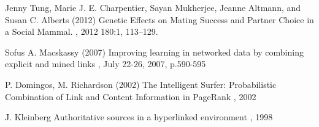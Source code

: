 \documentclass[twoside,twocolumn,paper=letter,fontsize=11pt]{article}
\begin{document}

\begin{thebibliography}{99} %

  Jenny Tung, Marie J. E. Charpentier, Sayan Mukherjee, Jeanne Altmann, and Susan C. Alberts (2012)
\newblock 
  Genetic Effects on Mating Success and Partner Choice in a Social Mammal.
, 2012 180:1, 113--129.

Sofus A. Macskassy (2007) 
\newblock
Improving learning in networked data by combining explicit and mined links
, July 22-26, 2007, p.590-595

P. Domingos, M. Richardson (2002) 
\newblock
 The Intelligent Surfer: Probabilistic Combination of Link and Content Information in PageRank
, 2002

J. Kleinberg
\newblock
Authoritative sources in a hyperlinked environment
, 1998
 
\end{thebibliography}

\end{document}
